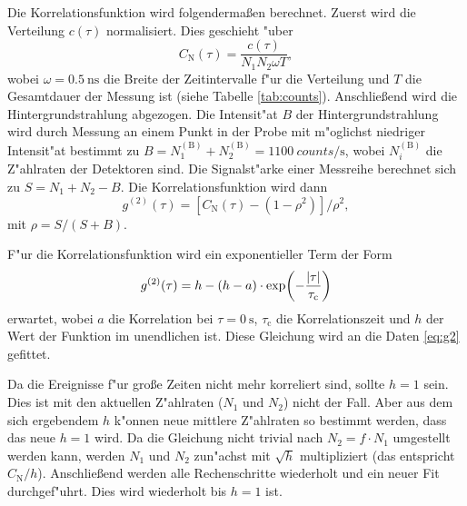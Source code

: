 Die Korrelationsfunktion wird folgenderma\ss en berechnet.
Zuerst wird die Verteilung $c(\tau)$ normalisiert.
Dies geschieht "uber
\begin{equation}
C_\text{N}(\tau)
    =\frac{c(\tau)}{N_1N_2\omega T},
    \label{eq:CN}
\end{equation}
wobei $\omega=\SI{0.5}{\nano\second}$ die Breite der Zeitintervalle f"ur die Verteilung und $T$ die Gesamtdauer der Messung ist (siehe Tabelle \vref{tab:counts}).
Anschlie\ss end wird die Hintergrundstrahlung abgezogen.
Die Intensit"at $B$ der Hintergrundstrahlung wird durch Messung an einem Punkt in der Probe mit m"oglichst niedriger Intensit"at bestimmt zu $B=N_1^{(\text{B})}+N_2^{(\text{B})}=\SI{1100}{counts\per\second}$, wobei $N_i^{(\text{B})}$ die Z"ahlraten der Detektoren sind.
Die Signalst"arke einer Messreihe berechnet sich zu $S=N_1+N_2-B$.
Die Korrelationsfunktion wird dann
\begin{equation}
g^{(2)}(\tau)
    =\left[ C_\text{N}(\tau)-(1-\rho^2)\right]/\rho^2,
    \label{eq:g2}
\end{equation}
mit $\rho=S/(S+B)$.

F"ur die Korrelationsfunktion wird ein exponentieller Term der Form
\begin{equation}
g^{(2)}(\tau)
    =h-(h-a)\cdot \exp(-\frac{\abs{\tau}}{\tau_\text{c}})
    \label{eq:fit}
\end{equation}
erwartet, wobei $a$ die Korrelation bei $\tau=\SI{0}{\second}$, $\tau_\text{c}$ die Korrelationszeit und $h$ der Wert der Funktion im unendlichen ist.
Diese Gleichung wird an die Daten \eqref{eq:g2} gefittet.

Da die Ereignisse f"ur gro\ss e Zeiten nicht mehr korreliert sind, sollte $h=1$ sein.
Dies ist mit den aktuellen Z"ahlraten ($N_1$ und $N_2$) nicht der Fall.
Aber aus dem sich ergebendem $h$ k"onnen neue mittlere Z"ahlraten so bestimmt werden, dass das neue $h=1$ wird.
Da die Gleichung nicht trivial nach $N_2=f\cdot N_1$ umgestellt werden kann, werden $N_1$ und $N_2$ zun"achst mit $\sqrt{h}$ multipliziert (das entspricht $C_\text{N}/h$).
Anschlie\ss end werden alle Rechenschritte wiederholt und ein neuer Fit durchgef"uhrt.
Dies wird wiederholt bis $h=1 $ ist.

